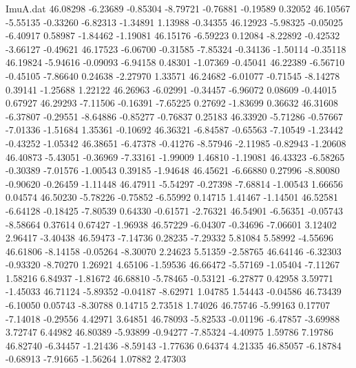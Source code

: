 \begin{filecontents}{ImuA.dat}
  46.08298   -6.23689   -0.85304   -8.79721   -0.76881   -0.19589    0.32052
  46.10567   -5.55135   -0.33260   -6.82313   -1.34891    1.13988   -0.34355
  46.12923   -5.98325   -0.05025   -6.40917    0.58987   -1.84462   -1.19081
  46.15176   -6.59223    0.12084   -8.22892   -0.42532   -3.66127   -0.49621
  46.17523   -6.06700   -0.31585   -7.85324   -0.34136   -1.50114   -0.35118
  46.19824   -5.94616   -0.09093   -6.94158    0.48301   -1.07369   -0.45041
  46.22389   -6.56710   -0.45105   -7.86640    0.24638   -2.27970    1.33571
  46.24682   -6.01077   -0.71545   -8.14278    0.39141   -1.25688    1.22122
  46.26963   -6.02991   -0.34457   -6.96072    0.08609   -0.44015    0.67927
  46.29293   -7.11506   -0.16391   -7.65225    0.27692   -1.83699    0.36632
  46.31608   -6.37807   -0.29551   -8.64886   -0.85277   -0.76837    0.25183
  46.33920   -5.71286   -0.57667   -7.01336   -1.51684    1.35361   -0.10692
  46.36321   -6.84587   -0.65563   -7.10549   -1.23442   -0.43252   -1.05342
  46.38651   -6.47378   -0.41276   -8.57946   -2.11985   -0.82943   -1.20608
  46.40873   -5.43051   -0.36969   -7.33161   -1.99009    1.46810   -1.19081
  46.43323   -6.58265   -0.30389   -7.01576   -1.00543    0.39185   -1.94648
  46.45621   -6.66880    0.27996   -8.80080   -0.90620   -0.26459   -1.11448
  46.47911   -5.54297   -0.27398   -7.68814   -1.00543    1.66656    0.04574
  46.50230   -5.78226   -0.75852   -6.55992    0.14715    1.41467   -1.14501
  46.52581   -6.64128   -0.18425   -7.80539    0.64330   -0.61571   -2.76321
  46.54901   -6.56351   -0.05743   -8.58664    0.37614    0.67427   -1.96938
  46.57229   -6.04307   -0.34696   -7.06601    3.12402    2.96417   -3.40438
  46.59473   -7.14736    0.28235   -7.29332    5.81084    5.58992   -4.55696
  46.61806   -8.14158   -0.05264   -8.30070    2.24623    5.51359   -2.58765
  46.64146   -6.32303   -0.93320   -8.70270    1.26921    4.65106   -1.59536
  46.66472   -5.57169   -1.05404   -7.11267    1.58216    6.84937   -1.81672
  46.68810   -5.78465   -0.53121   -6.27877    0.42958    3.59771   -1.45033
  46.71124   -5.89352   -0.04187   -8.62971    1.04785    1.54443   -0.04586
  46.73439   -6.10050    0.05743   -8.30788    0.14715    2.73518    1.74026
  46.75746   -5.99163    0.17707   -7.14018   -0.29556    4.42971    3.64851
  46.78093   -5.82533   -0.01196   -6.47857   -3.69988    3.72747    6.44982
  46.80389   -5.93899   -0.94277   -7.85324   -4.40975    1.59786    7.19786
  46.82740   -6.34457   -1.21436   -8.59143   -1.77636    0.64374    4.21335
  46.85057   -6.18784   -0.68913   -7.91665   -1.56264    1.07882    2.47303

\end{filecontents}
